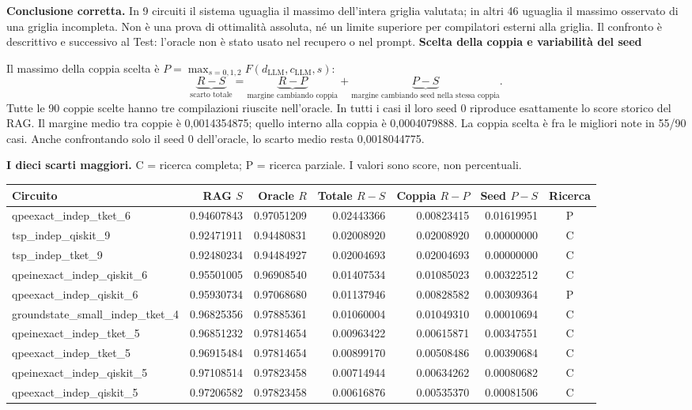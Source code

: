 \documentclass[10pt,a4paper,landscape]{article}
\newcommand{\titolo}[1]{{\Large\bfseries #1}\par\vspace{3mm}}
\begin{document}
\textbf{Conclusione corretta.}
In 9 circuiti il sistema uguaglia il massimo dell'intera griglia valutata;
in altri 46 uguaglia il massimo osservato di una griglia incompleta.
Non è una prova di ottimalità assoluta, né un limite superiore per compilatori esterni alla griglia.
Il confronto è descrittivo e successivo al Test: l'oracle non è stato usato nel recupero o nel prompt.
\newpage
\titolo{Scelta della coppia e variabilità del seed}
Il massimo della coppia scelta è $P=\max_{s=0,1,2}F(d_{\mathrm{LLM}},c_{\mathrm{LLM}},s)$:
\[
\underbrace{R-S}_{\text{scarto totale}} =
\underbrace{R-P}_{\text{margine cambiando coppia}}+
\underbrace{P-S}_{\text{margine cambiando seed nella stessa coppia}}.
\]
Tutte le 90 coppie scelte hanno tre compilazioni riuscite nell'oracle.
In tutti i casi il loro seed 0 riproduce esattamente lo score storico del RAG.
Il margine medio tra coppie è 0,0014354875; quello interno alla coppia è 0,0004079888.
La coppia scelta è fra le migliori note in 55/90 casi.
Anche confrontando solo il seed 0 dell'oracle, lo scarto medio resta 0,0018044775.

\textbf{I dieci scarti maggiori.} C = ricerca completa; P = ricerca parziale.
I valori sono score, non percentuali.

\begin{tabular}{lrrrrrc}
\toprule
Circuito & RAG $S$ & Oracle $R$ & Totale $R-S$ & Coppia $R-P$ & Seed $P-S$ & Ricerca \\
\midrule
qpeexact\_indep\_tket\_6 & 0.94607843 & 0.97051209 & 0.02443366 & 0.00823415 & 0.01619951 & P \\
tsp\_indep\_qiskit\_9 & 0.92471911 & 0.94480831 & 0.02008920 & 0.02008920 & 0.00000000 & C \\
tsp\_indep\_tket\_9 & 0.92480234 & 0.94484927 & 0.02004693 & 0.02004693 & 0.00000000 & C \\
qpeinexact\_indep\_qiskit\_6 & 0.95501005 & 0.96908540 & 0.01407534 & 0.01085023 & 0.00322512 & C \\
qpeexact\_indep\_qiskit\_6 & 0.95930734 & 0.97068680 & 0.01137946 & 0.00828582 & 0.00309364 & P \\
groundstate\_small\_indep\_tket\_4 & 0.96825356 & 0.97885361 & 0.01060004 & 0.01049310 & 0.00010694 & C \\
qpeinexact\_indep\_tket\_5 & 0.96851232 & 0.97814654 & 0.00963422 & 0.00615871 & 0.00347551 & C \\
qpeexact\_indep\_tket\_5 & 0.96915484 & 0.97814654 & 0.00899170 & 0.00508486 & 0.00390684 & C \\
qpeinexact\_indep\_qiskit\_5 & 0.97108514 & 0.97823458 & 0.00714944 & 0.00634262 & 0.00080682 & C \\
qpeexact\_indep\_qiskit\_5 & 0.97206582 & 0.97823458 & 0.00616876 & 0.00535370 & 0.00081506 & C \\
\bottomrule
\end{tabular}
\end{document}
